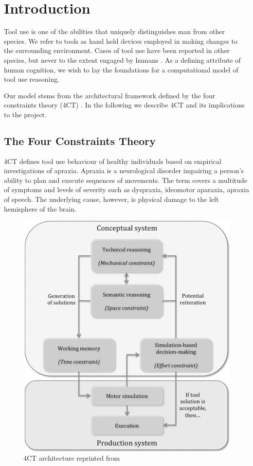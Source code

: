 \documentclass[11]{article}
\begin{document}
\section{Introduction}
Tool use is one of the abilities that uniquely distinguishes man from other species. 
We refer to tools as hand held devices employed in making changes to the surrounding environment. 
Cases of tool use have been reported in other species, but never to the extent engaged by humans \cite{boysen1999,harrington2009,lefebvre2004}. 
As a defining attribute of human cognition, we wish to lay the foundations for a computational model of tool use reasoning.

Our model stems from the architectural framework defined by the four constraints theory (4CT) \cite{osiurak2014a}.
In the following we describe 4CT and its implications to the project.  

\subsection{The Four Constraints Theory}
4CT defines tool use behaviour of healthy individuals based on empirical investigations of apraxia.
Apraxia is a neurological disorder impairing a person's ability to plan and execute sequences of movements.
The term covers a multitude of symptoms and levels of severity such as dyspraxia, ideomotor aparaxia, apraxia of speech.
The underlying cause, however, is physical damage to the left hemisphere of the brain\cite{osiurak2013}.

\begin{figure}[h]
  \centering
  \includegraphics[width=.9\textwidth]{figures/4CTArchitecture.png}
  \caption{4CT architecture reprinted from \cite{osiurak2014a}}
  \label{fig:4CTArchitecture}
\end{figure}      
\end{document}
